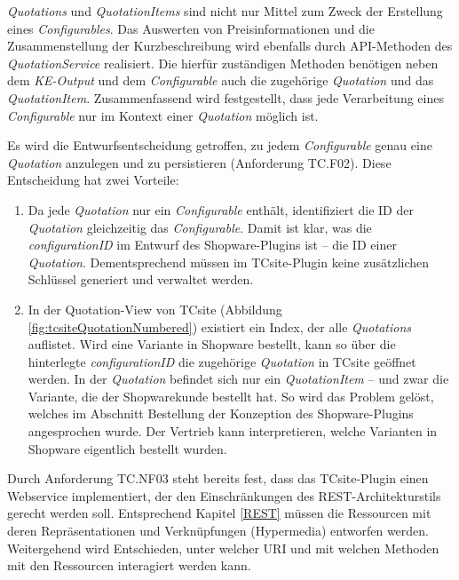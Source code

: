 \documentclass[11pt, a4paper, titlepage, listof=totoc, bibliography=totoc, index=totoc, twoside, openright, headings=normal, draft]{scrreprt}
\begin{document}
\emph{Quotations} und \emph{QuotationItems} sind nicht nur Mittel zum Zweck der Erstellung eines \emph{Configurables}. Das Auswerten von Preisinformationen und die Zusammenstellung der Kurzbeschreibung wird ebenfalls durch API-Methoden des \emph{QuotationService} realisiert. Die hierfür zuständigen Methoden benötigen neben dem \emph{KE-Output} und dem \emph{Configurable} auch die zugehörige \emph{Quotation} und das \emph{QuotationItem}. Zusammenfassend wird festgestellt, dass jede Verarbeitung eines \emph{Configurable} nur im Kontext einer \emph{Quotation} möglich ist.

Es wird die Entwurfsentscheidung getroffen, zu jedem \emph{Configurable} genau eine \emph{Quotation} anzulegen und zu persistieren (Anforderung TC.F02). Diese Entscheidung hat zwei Vorteile:
\begin{enumerate}
\item Da jede \emph{Quotation} nur ein \emph{Configurable} enthält, identifiziert die ID der \emph{Quotation} gleichzeitig das \emph{Configurable}. Damit ist klar, was die \emph{configurationID} im Entwurf des Shopware-Plugins ist -- die ID einer \emph{Quotation}.  Dementsprechend müssen im TCsite-Plugin keine zusätzlichen Schlüssel generiert und verwaltet werden.
\item In der Quotation-View von TCsite (Abbildung \ref{fig:tcsiteQuotationNumbered}) existiert ein Index, der alle \emph{Quotations} auflistet. Wird eine Variante in Shopware bestellt, kann so über die hinterlegte \emph{configurationID} die zugehörige \emph{Quotation} in TCsite geöffnet werden. In der \emph{Quotation} befindet sich nur ein \emph{QuotationItem} -- und zwar die Variante, die der Shopwarekunde bestellt hat. So wird das Problem gelöst, welches im Abschnitt \glqq Bestellung\grqq{} der Konzeption des Shopware-Plugins angesprochen wurde. Der Vertrieb kann interpretieren, welche Varianten in Shopware eigentlich bestellt wurden.
\end{enumerate}

Durch Anforderung TC.NF03 steht bereits fest, dass das TCsite-Plugin einen Webservice implementiert, der den Einschränkungen des REST-Architekturstils gerecht werden soll. Entsprechend Kapitel \ref{REST} müssen die Ressourcen mit deren Repräsentationen und Verknüpfungen (Hypermedia) entworfen werden. Weitergehend wird Entschieden, unter welcher URI und mit welchen Methoden mit den Ressourcen interagiert werden kann.
\end{document}
